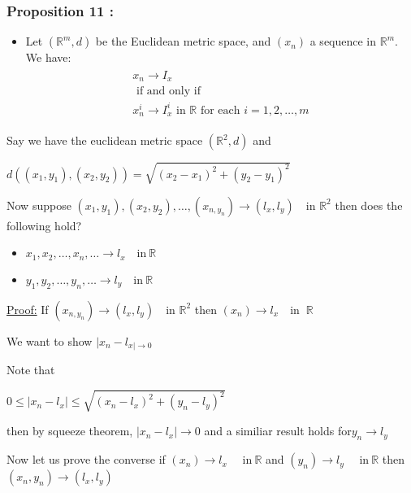 \documentclass[12pt,a4paper]{article}
\begin{document}
 \subsubsection{Proposition 11 :} 
\begin{itemize}
    \item  Let \(\left(\mathbb{R}^m, d\right)\) be the Euclidean metric space, and \(\left(x_n\right)\) a sequence in \(\mathbb{R}^m\). We have:
    \begin{align*}
        \begin{gathered}
        x_n \rightarrow I_x \\
        \text { if and only if } \\
        x_n^i \rightarrow I_x^i \text { in } \mathbb{R} \text { for each } i=1,2, \ldots, m
        \end{gathered}
        \end{align*}
\end{itemize}
Say we have the euclidean metric space \(\left( \mathbb{R}^2,d \right) \) and 

\(d((x_{1},y_{1}),(x_{2},y_{2}))= \sqrt{\left( x_{2}-x_{1} \right)^2 + \left( y_{2} - y_{1} \right)^2  }\)    

Now suppose \((x_{1},y_{1}),(x_{2},y_{2}),\ldots,(x_{n,y_{n}}) \to \left( l_{x}, l_{y} \right) \quad \text{in } \mathbb{R}^2 \) then does the following hold?
\begin{itemize}
    \item \(x_{1},x_{2},\ldots,x_{n}, \ldots \to l_{x} \quad \text{in} \ \mathbb{R}\)  
    \item \(y_{1},y_{2},\ldots,y_{n}, \ldots \to l_{y} \quad \text{in} \ \mathbb{R}\)  
\end{itemize}

\underline{Proof:} If \((x_{n,y_{n}}) \to \left( l_{x}, l_{y} \right) \quad \text{in } \mathbb{R}^2 \) then \((x_{n}) \to l_{x} \quad \text{in } \ \mathbb{R}\) 

We want to show \(|x_{n}-l_{x| \to 0}\)  

Note that 

\(0 \leq |x_{n} - l_{x} | \leq \sqrt{(x_{n}- l_{x})^2 + (y_{n}-l_{y})^2}\)

then by squeeze theorem, \(|x_{n}-l_{x}| \to 0\) and a similiar result holds for\(y_{n} \to l_{y}\)

Now let us prove the converse if \((x_{n}) \to l_{x} \quad \text{ in} \ \mathbb{R}\) and \((y_{n}) \to l_{y} \quad \text{ in} \ \mathbb{R}\) then \((x_{n},y_{n}) \to (l_{x},l_{y})\)
\end{document}
